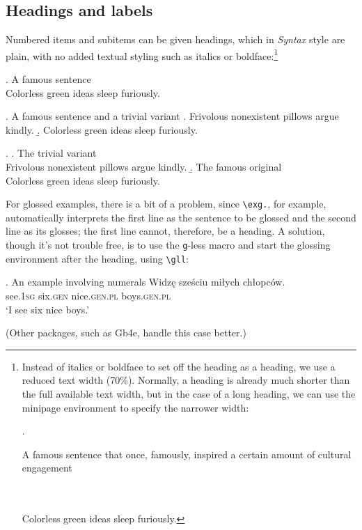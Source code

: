 \documentclass[letterpaper,12pt, twoside]{article}
\begin{document}
\subsection{Headings and labels}

Numbered items and subitems can be given headings, which in \emph{Syntax} style are plain, with no added textual styling such as italics or boldface:\footnote{Instead of italics or boldface to set off the heading as a heading, we use a reduced text width (70\%). Normally, a heading is already much shorter than the full available text width, but in the case of a long heading, we can use the minipage environment to specify the narrower width:

\ex.  
\begin{minipage}[t]{0.7\textwidth}
\raggedright A famous sentence that once, famously,  inspired a certain amount of cultural engagement \\\
\end{minipage}\\
Colorless green ideas sleep furiously. 

}

\ex.  A famous sentence\\
Colorless green ideas sleep furiously. 

\ex. A famous sentence and a trivial variant
\a. Frivolous nonexistent pillows argue kindly.
\b. Colorless green ideas sleep furiously.

\ex. 
\a. The trivial variant\\Frivolous nonexistent pillows argue kindly.
\b. The famous original\\Colorless green ideas sleep furiously.
 
 



For glossed examples, there is a bit of a problem, since  \verb|\exg.|, for example, automatically interprets the first line as the sentence to be glossed and the second line as its glosses; the first line cannot, therefore, be a heading. A solution, though it's not trouble free, is to use the \verb|g|-less macro and start the glossing environment after the heading, using  \verb|\gll|: 


\ex. An example involving numerals
\gll Widz\k{e}  sze\'sciu {mi\l ych} {ch\l opc\'ow}. \\ 
see.\textsc{1sg} six.\textsc{gen} nice.\textsc{gen.pl} boys.\textsc{gen.pl} \\
 \glt `I see six nice boys.'

(Other packages, such as Gb4e, handle this case better.) 
\end{document}
